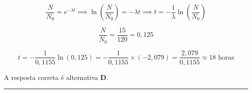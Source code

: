 \documentclass[a4paper,12pt]{article}
\begin{document}
\begin{flushleft}
\vspace{0.3cm}


\[
\frac{N}{N_0} = e^{-\lambda t} \implies \ln\left(\frac{N}{N_0}\right) = -\lambda t \implies t = -\frac{1}{\lambda} \ln\left(\frac{N}{N_0}\right)
\]

\vspace{0.3cm}


\[
\frac{N}{N_0} = \frac{15}{120} = 0{,}125
\]

\[
t = -\frac{1}{0{,}1155} \ln(0{,}125) = -\frac{1}{0{,}1155} \times (-2{,}079) = \frac{2{,}079}{0{,}1155} \approx 18 \text{ horas}
\]

\vspace{0.3cm}


A resposta correta é alternativa \colorbox{green!50}{\textbf{D}}.
\end{flushleft}

\noindent\rule{\linewidth}{0.6pt}\\
\end{document}
